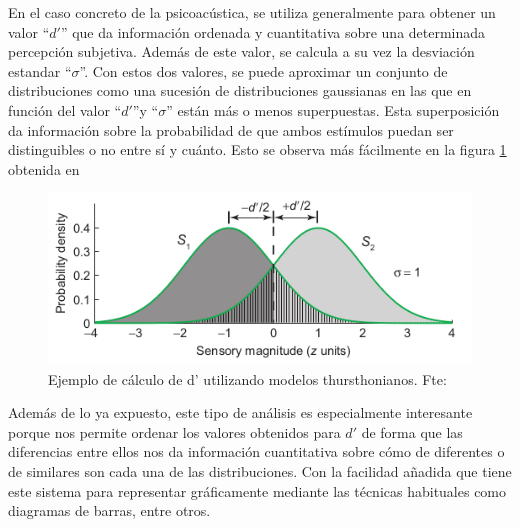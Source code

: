 \documentclass[11pt,a4paper,twoside]{book}
\begin{document}
            En el caso concreto de la psicoacústica, se utiliza generalmente para obtener un valor ``$d'$'' que da información ordenada y cuantitativa sobre una determinada percepción subjetiva. Además de este valor, se calcula a su vez la desviación estandar ``$\sigma$''. Con estos dos valores, se puede aproximar un conjunto de distribuciones como una sucesión de distribuciones gaussianas en las que en función del valor ``$d'$''y ``$\sigma$'' están más o menos superpuestas. Esta superposición da información sobre la probabilidad de que ambos estímulos puedan ser distinguibles o no entre sí y cuánto. Esto se observa más fácilmente en la figura \ref{fig:modelost} obtenida en \cite{PsychophysicsB} 
            
            \begin{figure}
                \includegraphics[scale=0.7]{../imagenes/modelosthurst.png}
			    \centering
			    \caption{Ejemplo de cálculo de d' utilizando modelos thursthonianos. Fte: \cite{PsychophysicsB} }
			    \label{fig:modelost}
            \end{figure}
            
            Además de lo ya expuesto, este tipo de análisis es especialmente interesante porque nos permite ordenar los valores obtenidos para $d'$ de forma que las diferencias entre ellos nos da información cuantitativa sobre cómo de diferentes o de similares son cada una de las distribuciones. Con la facilidad añadida que tiene este sistema para representar gráficamente mediante las técnicas habituales como diagramas de barras, entre otros.
            

    
\end{document}
